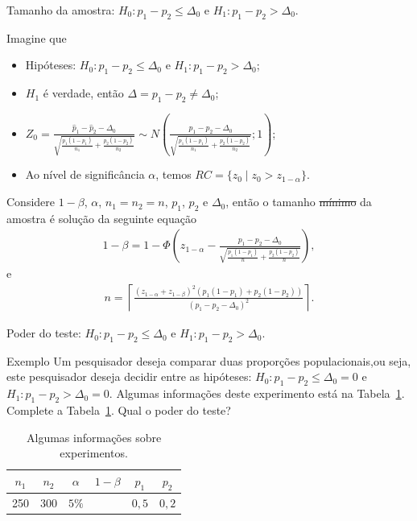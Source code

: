 \documentclass[9pt]{beamer}
\begin{document}
\begin{frame}{Tamanho da amostra: $H_0:p_1 - p_2 \leq \Delta_0$ e $H_1: p_1 - p_2 > \Delta_0$.}

Imagine que
\begin{itemize}
	\item Hipóteses: $H_0: p_1 - p_2 \leq \Delta_0$ e $H_1: p_1 -  p_2 > \Delta_0$;
	\item $H_1$ é verdade, então $\Delta = p_1-p_2 \neq \Delta_0$;
	\item $Z_0 = \frac{\hat{p}_1 - \hat{p}_2 - \Delta_0}{\sqrt{ 
			\frac{p_1(1-p_1)}{n_1} + \frac{p_2(1-p_2)}{n_2} }} \sim N\left( \frac{p_1 - p_2 - \Delta_0}{\sqrt{\frac{p_1(1-p_1)}{n_1} + \frac{p_2(1-p_2)}{n_2}}};1 \right)$;
	\item Ao nível de significância $\alpha$, temos $RC = \{ z_0 \mid z_0 > z_{1-\alpha}  \}$.
\end{itemize}
\vfill

Considere $1-\beta$, $\alpha$, $n_1=n_2=n$, $p_1$, $p_2$ e $\Delta_0$, então o tamanho \sout{mínimo} da amostra é solução da seguinte equação
\begin{align*}
1-\beta = 1 - \Phi\left( z_{1-\alpha} - \frac{p_1-p_2 - \Delta_0}{\sqrt{\frac{p_1(1-p_1)}{n} + \frac{p_2(1-p_2)}{n}}} \right),
\end{align*}
e
\begin{align*}
n = \left\lceil \frac{\left( z_{1-\alpha} + z_{1-\beta} \right)^2 \left( p_1(1 - p_1) + p_2(1 - p_2) \right)}{\left(p_1 - p_2 - \Delta_0\right)^2} \right\rceil.
\end{align*}
\end{frame}

\begin{frame}{Poder do teste: $H_0:p_1 - p_2 \leq \Delta_0$ e $H_1: p_1 - p_2 > \Delta_0$.}

\begin{block}{Exemplo}
	Um pesquisador deseja comparar duas proporções populacionais,ou seja, este pesquisador deseja decidir entre as hipóteses: $H_0: p_1 - p_2 \leq \Delta_0 =0$ e $H_1: p_1 - p_2 > \Delta_0 =0$. Algumas informações deste experimento está na Tabela~\ref{tab:h1-less-2-proportion-power}. Complete a Tabela~\ref{tab:h1-less-2-proportion-power}. Qual o poder do teste? 
	\begin{table}[htbp]
		\centering
		\begin{tabular}{c|c|c|c|c|c}
			\toprule[0.05cm]
			$n_1$ & $n_2$ & $\alpha$ & $1-\beta$ & $p_1$ & $p_2$ \\ \midrule
			250 & 300 & $5\%$ &  & $0,5$  & $0,2$ \\ \bottomrule[0.05cm]
		\end{tabular}
		\caption{Algumas informações sobre experimentos.}
		\label{tab:h1-less-2-proportion-power}
	\end{table}
\end{block}

\end{frame}
\end{document}
